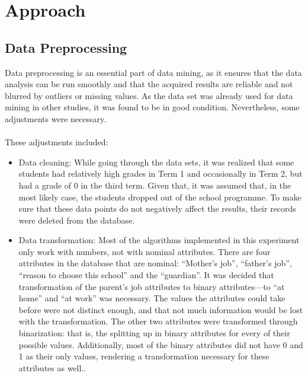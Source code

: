 \section{Approach}	
	\subsection{Data Preprocessing}
	Data preprocessing is an essential part of data mining, as it ensures that the data analysis can be run smoothly and that the acquired results are reliable and not blurred by outliers or missing values. As the data set was already used for data mining in other studies, it was found to be in good condition. Nevertheless, some adjustments were necessary.
	\\
	\\ These adjustments included:
	\begin{itemize}
	    \item Data cleaning: While going through the data sets, it was realized that some students had relatively high grades in Term 1 and occasionally in Term 2, but had a grade of 0 in the third term. Given that, it was assumed that, in the most likely case, the students dropped out of the school programme. To make sure that these data points do not negatively affect the results, their records were deleted from the database.
	    \item Data transformation: Most of the algorithms implemented in this experiment only work with numbers, not with nominal attributes. There are four attributes in the database that are nominal: ``Mother's job'', ``father's job'', ``reason to choose this school'' and the ``guardian''. It was decided that transformation of the parent's job attributes to binary attributes—to ``at home'' and ``at work'' was necessary. The values the attributes could take before were not distinct enough, and that not much information would be lost with the transformation. The other two attributes were transformed through binarization: that is, the splitting up in binary attributes for every of their possible values. Additionally, most of the binary attributes did not have 0 and 1 as their only values, rendering a transformation necessary for these attributes as well..
	    \end{itemize}
	    
